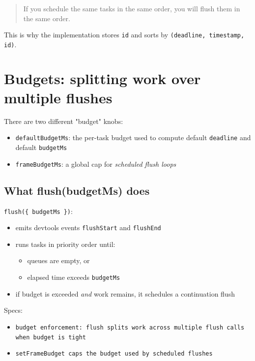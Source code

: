 \begin{quote}
If you schedule the same tasks in the same order, you will flush them in the same order.
\end{quote}

This is why the implementation stores \texttt{id} and sorts by \texttt{(deadline, timestamp, id)}.

\section{Budgets: splitting work over multiple flushes}

There are two different "budget" knobs:

\begin{itemize}
  \item \texttt{defaultBudgetMs}: the per-task budget used to compute default \texttt{deadline} and default \texttt{budgetMs}
  \item \texttt{frameBudgetMs}: a global cap for \emph{scheduled flush loops}
\end{itemize}

\subsection{What flush(budgetMs) does}

\texttt{flush(\{ budgetMs \})}:

\begin{itemize}
  \item emits devtools events \texttt{flushStart} and \texttt{flushEnd}
  \item runs tasks in priority order until:
    \begin{itemize}
      \item queues are empty, or
      \item elapsed time exceeds \texttt{budgetMs}
    \end{itemize}
  \item if budget is exceeded \emph{and} work remains, it schedules a continuation flush
\end{itemize}

Specs:

\begin{itemize}
  \item \texttt{budget enforcement: flush splits work across multiple flush calls when budget is tight}
  \item \texttt{setFrameBudget caps the budget used by scheduled flushes}
\end{itemize}

